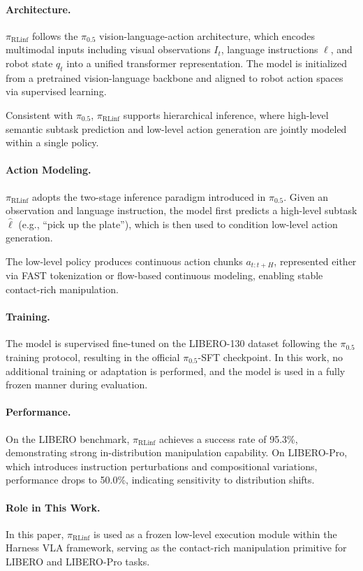 \documentclass[11pt]{article}
\newcommand{\piRLinf}{\pi_{\mathrm{RLinf}}}
\begin{document}
\paragraph{Architecture.}
$\piRLinf$ follows the $\pi_{0.5}$ vision-language-action architecture, which encodes multimodal inputs including visual observations $I_t$, language instructions $\ell$, and robot state $q_t$ into a unified transformer representation. The model is initialized from a pretrained vision-language backbone and aligned to robot action spaces via supervised learning.

Consistent with $\pi_{0.5}$, $\piRLinf$ supports hierarchical inference, where high-level semantic subtask prediction and low-level action generation are jointly modeled within a single policy.

\paragraph{Action Modeling.}
$\piRLinf$ adopts the two-stage inference paradigm introduced in $\pi_{0.5}$. Given an observation and language instruction, the model first predicts a high-level subtask $\hat{\ell}$ (e.g., “pick up the plate”), which is then used to condition low-level action generation.

The low-level policy produces continuous action chunks $a_{t:t+H}$, represented either via FAST tokenization or flow-based continuous modeling, enabling stable contact-rich manipulation.

\paragraph{Training.}
The model is supervised fine-tuned on the LIBERO-130 dataset following the $\pi_{0.5}$ training protocol, resulting in the official $\pi_{0.5}$-SFT checkpoint. In this work, no additional training or adaptation is performed, and the model is used in a fully frozen manner during evaluation.

\paragraph{Performance.}
On the LIBERO benchmark, $\piRLinf$ achieves a success rate of 95.3\%, demonstrating strong in-distribution manipulation capability. On LIBERO-Pro, which introduces instruction perturbations and compositional variations, performance drops to 50.0\%, indicating sensitivity to distribution shifts.

\paragraph{Role in This Work.}
In this paper, $\piRLinf$ is used as a frozen low-level execution module within the Harness VLA framework, serving as the contact-rich manipulation primitive for LIBERO and LIBERO-Pro tasks.
\end{document}
